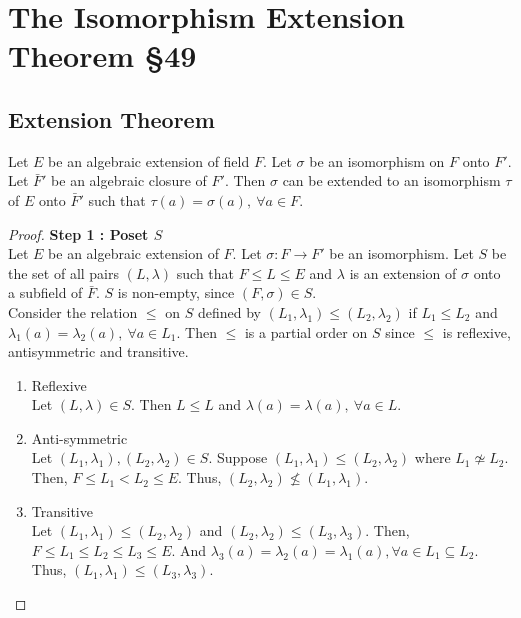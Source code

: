 \section{The Isomorphism Extension Theorem \S49}
\subsection{Extension Theorem}
\begin{theorem}
	Let $E$ be an algebraic extension of field $F$.
	Let $\sigma$ be an isomorphism on $F$ onto $F'$.
	Let $\bar{F}'$ be an algebraic closure of $F'$.
	Then $\sigma$ can be extended to an isomorphism $\tau$ of $E$ onto $\bar{F}'$ such that $\tau(a) = \sigma(a),\ \forall a \in F$.
\end{theorem}
\begin{proof}
	\textbf{Step 1 : Poset $S$}\\
	Let $E$ be an algebraic extension of $F$.
	Let $\sigma : F \to F'$ be an isomorphism.
	Let $S$ be the set of all pairs $(L,\lambda)$ such that $F \le L \le E$ and $\lambda$ is an extension of $\sigma$ onto a subfield of $\bar{F}$.
	$S$ is non-empty, since $(F,\sigma) \in S$.\\

	Consider the relation $\le$ on $S$ defined by $(L_1,\lambda_1) \le (L_2,\lambda_2)$ if $L_1 \le L_2$ and $\lambda_1(a) = \lambda_2(a),\ \forall a \in L_1$.
	Then $\le$ is a partial order on $S$ since $\le$ is reflexive, antisymmetric and transitive.
	\begin{commentary}
	\begin{enumerate}
		\item Reflexive\\
		Let $(L,\lambda) \in S$.
		Then $L \le L$ and $\lambda(a) = \lambda(a),\ \forall a \in L$.
		\item Anti-symmetric\\
		Let $(L_1,\lambda_1), (L_2,\lambda_2) \in S$.
		Suppose $(L_1,\lambda_1) \le (L_2,\lambda_2)$ where $L_1 \not\simeq L_2$.
		Then, $F \le L_1 < L_2 \le E$.
		Thus, $(L_2,\lambda_2) \not\le (L_1,\lambda_1)$.
		\item Transitive\\
		Let $(L_1,\lambda_1) \le (L_2,\lambda_2)$ and $(L_2,\lambda_2) \le (L_3,\lambda_3)$.
		Then, $F \le L_1 \le L_2 \le L_3 \le E$.
		And $\lambda_3(a) = \lambda_2(a) = \lambda_1(a), \forall a \in L_1 \subseteq L_2$.\\
		Thus, $(L_1,\lambda_1) \le (L_3,\lambda_3)$.
	\end{enumerate}
	\end{commentary}


\end{proof}
